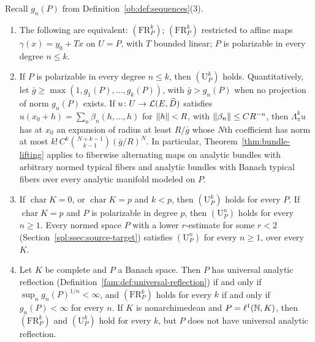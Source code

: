 Recall $g_n(P)$ from Definition~\ref{ob:def:sequences}(3).

\begin{theorem}\label{fam2:thm:polarizable}
\begin{enumerate}
\item The following are equivalent: $(\mathrm{FR}^k_P)$; $(\mathrm{FR}^k_P)$ restricted to affine maps
$\gamma(x)=y_0+Tx$ on $U=P$, with $T$ bounded linear; $P$ is polarizable in every degree $n\le k$.
\item If $P$ is polarizable in every degree $n\le k$, then $(\mathrm U^k_P)$ holds. Quantitatively, let
$\bar g\ge\max(1,g_1(P),\dots,g_k(P))$, with $\bar g>g_n(P)$ when no projection of norm $g_n(P)$ exists. If
$u\colon U\to\mathcal L(E,\widehat D)$ satisfies $u(x_0+h)=\sum_n\beta_n(h,\dots,h)$ for $\lVert h\rVert<R$, with
$\lVert \beta_n\rVert\le CR^{-n}$, then $\Lambda^k_\pi u$ has at $x_0$ an expansion of radius at least $R/\bar g$ whose $N$th
coefficient has norm at most $k!\,C^k\binom{N+k-1}{k-1}(\bar g/R)^N$. In particular, Theorem~\ref{thm:bundle-lifting}
applies to fiberwise alternating maps on analytic bundles with arbitrary normed typical fibers and analytic bundles with
Banach typical fibers over every analytic manifold modeled on $P$.
\item If $\operatorname{char}K=0$, or $\operatorname{char}K=p$ and $k<p$, then $(\mathrm U^k_P)$ holds for every $P$. If
$\operatorname{char}K=p$ and $P$ is polarizable in degree $p$, then $(\mathrm U^n_P)$ holds for every $n\ge1$. Every normed
space $P$ with a lower $r$-estimate for some $r<2$ (Section~\ref{spl:ssec:source-target}) satisfies $(\mathrm U^n_P)$ for
every $n\ge1$, over every $K$.
\item Let $K$ be complete and $P$ a Banach space. Then $P$ has universal analytic reflection
(Definition~\ref{fam:def:universal-reflection}) if and only if $\sup_ng_n(P)^{1/n}<\infty$, and $(\mathrm{FR}^k_P)$ holds
for every $k$ if and only if $g_n(P)<\infty$ for every $n$. If $K$ is nonarchimedean and $P=\ell^1(\mathbb N,K)$, then
$(\mathrm{FR}^k_P)$ and $(\mathrm U^k_P)$ hold for every $k$, but $P$ does not have universal analytic reflection.
\end{enumerate}
\end{theorem}

